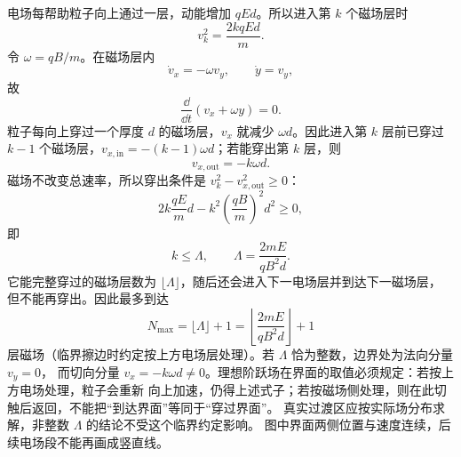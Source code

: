 \begin{xesolution}
电场每帮助粒子向上通过一层，动能增加 $qEd$。所以进入第 $k$ 个磁场层时
\begin{equation}
  v_k^2=\frac{2kqEd}{m}.
\end{equation}
令 $\omega=qB/m$。在磁场层内
\[
  \dot v_x=-\omega v_y,
  \qquad \dot y=v_y,
\]
故
\begin{equation}
  \frac{\dd}{\dd t}(v_x+\omega y)=0.
\end{equation}
粒子每向上穿过一个厚度 $d$ 的磁场层，$v_x$ 就减少 $\omega d$。因此进入第 $k$ 层前已穿过
$k-1$ 个磁场层，$v_{x,\mathrm{in}}=-(k-1)\omega d$；若能穿出第 $k$ 层，则
\[
  v_{x,\mathrm{out}}=-k\omega d.
\]
磁场不改变总速率，所以穿出条件是 $v_k^2-v_{x,\mathrm{out}}^2\ge0$：
\begin{equation}
  2k\frac{qE}{m}d-k^2\left(\frac{qB}{m}\right)^2d^2\ge0,
\end{equation}
即
\begin{equation}
  k\le \Lambda,
  \qquad \Lambda=\frac{2mE}{qB^2d}.
\end{equation}
它能完整穿过的磁场层数为 $\lfloor\Lambda\rfloor$，随后还会进入下一电场层并到达下一磁场层，
但不能再穿出。因此最多到达
\begin{equation}
  \boxed{N_{\max}=\lfloor\Lambda\rfloor+1
  =\left\lfloor\frac{2mE}{qB^2d}\right\rfloor+1}
\end{equation}
层磁场（临界擦边时约定按上方电场层处理）。若 $\Lambda$ 恰为整数，边界处为法向分量 $v_y=0$，
而切向分量 $v_x=-k\omega d\ne0$。理想阶跃场在界面的取值必须规定：若按上方电场处理，粒子会重新
向上加速，仍得上述式子；若按磁场侧处理，则在此切触后返回，不能把“到达界面”等同于“穿过界面”。
真实过渡区应按实际场分布求解，非整数 $\Lambda$ 的结论不受这个临界约定影响。
图中界面两侧位置与速度连续，后续电场段不能再画成竖直线。

\alternatingLayersDiagram
\end{xesolution}

